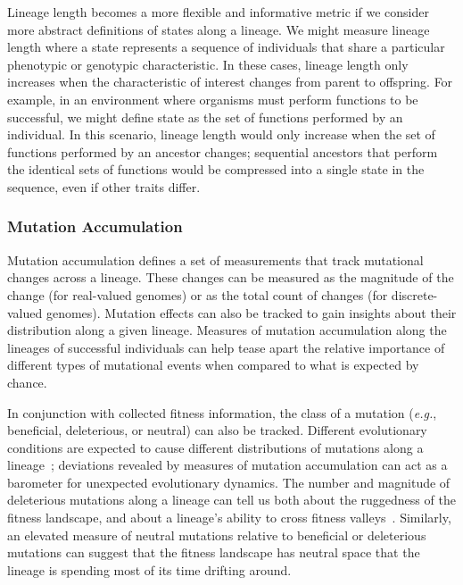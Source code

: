 \documentclass[letterpaper]{article}
\begin{document}
Lineage length becomes a more flexible and informative metric if we consider more abstract definitions of states along a lineage. We might measure lineage length where a state represents a sequence of individuals that share a particular phenotypic or genotypic characteristic. In these cases, lineage length only increases when the characteristic of interest changes from parent to offspring. For example, in an environment where organisms must perform functions to be successful, we might define state as the set of functions performed by an individual. In this scenario, lineage length would only increase when the set of functions performed by an ancestor changes; sequential ancestors that perform the identical sets of functions would be compressed into a single state in the sequence, even if other traits differ. 

\subsubsection{Mutation Accumulation}
Mutation accumulation defines a set of measurements that track mutational changes across a lineage. These changes can be measured as the magnitude of the change (for real-valued genomes) or as the total count of changes (for discrete-valued genomes). Mutation effects can also be tracked to gain insights about their distribution along a given lineage. Measures of mutation accumulation along the lineages of successful individuals can help tease apart the relative importance of different types of mutational events when compared to what is expected by chance. 

In conjunction with collected fitness information, the class of a mutation (\textit{e.g.}, beneficial, deleterious, or neutral) can also be tracked. Different evolutionary conditions are expected to cause different distributions of mutations along a lineage~\citep{barrick2013genome}; deviations revealed by measures of mutation accumulation can act as a barometer for unexpected evolutionary dynamics.  
The number and magnitude of deleterious mutations along a lineage can tell us both about the ruggedness of the fitness landscape, and about a lineage's ability to cross fitness valleys~\citep{covert_experiments_2013}. 
Similarly, an elevated measure of neutral mutations relative to beneficial or deleterious mutations can suggest that the fitness landscape has neutral space that the lineage is spending most of its time drifting around. 
\end{document}
